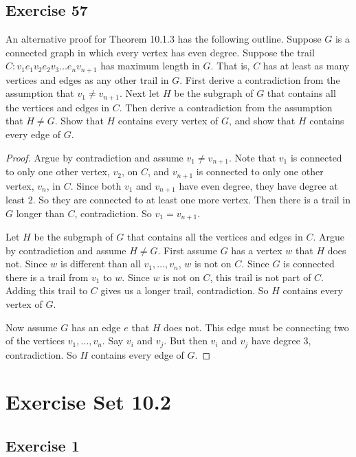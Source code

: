 \documentclass[14pt]{extarticle}
\begin{document}
\subsection{Exercise 57}
An alternative proof for Theorem 10.1.3 has the following outline. Suppose \(G\) is a connected graph in which every 
vertex has even degree. Suppose the trail \\ \(C: v_1e_1v_2e_2v_3 \ldots e_nv_{n+1}\) has maximum length in 
\(G\). That is, \(C\) has at least as many vertices and edges as any other trail in \(G\). First derive a contradiction from 
the assumption that \(v_1 \neq v_{n+1}\). Next let \(H\) be the subgraph of \(G\) that contains all the vertices and edges 
in \(C\). Then derive a contradiction from the assumption that \(H \neq G\). Show that \(H\) contains every vertex of \(G\), 
and show that \(H\) contains every edge of \(G\).

\begin{proof}
Argue by contradiction and assume \(v_1 \neq v_{n+1}\). Note that \(v_1\) is connected to only one other vertex, \(v_2\), 
on \(C\), and \(v_{n+1}\) is connected to only one other vertex, \(v_n\), in \(C\). Since both \(v_1\) and \(v_{n+1}\)
have even degree, they have degree at least 2. So they are connected to at least one more vertex. Then there is a trail 
in \(G\) longer than \(C\), contradiction. So \(v_1 = v_{n+1}\).

Let \(H\) be the subgraph of \(G\) that contains all the vertices and edges in \(C\). Argue by contradiction and assume
\(H \neq G\). First assume \(G\) has a vertex \(w\) that \(H\) does not. Since \(w\) is different than all \(v_1, \ldots, 
v_n\), \(w\) is not on \(C\). Since \(G\) is connected there is a trail from \(v_1\) to \(w\). Since \(w\) is not on \(C\), 
this trail is not part of \(C\). Adding this trail to \(C\) gives us a longer trail, contradiction. So \(H\) contains 
every vertex of \(G\). 

Now assume \(G\) has an edge \(e\) that \(H\) does not. This edge must be connecting two of the vertices \(v_1, \ldots, 
v_n\). Say \(v_i\) and \(v_j\). But then \(v_i\) and \(v_j\) have degree 3, contradiction. So \(H\) contains every edge 
of \(G\).
\end{proof}

\section{Exercise Set 10.2}
\subsection{Exercise 1}
\end{document}
